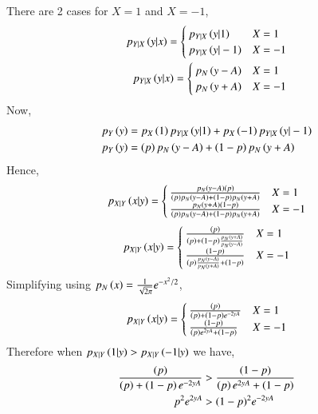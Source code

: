 \documentclass[journal,12pt,twocolumn]{IEEEtran}
\renewcommand\thesection{\arabic{section}}
\begin{document}
\begin{enumerate}[label=\thesection.\arabic*
,ref=\thesection.\theenumi]
There are 2 cases for $X= 1$ and $X = -1$,
\begin{align}
	 p_{Y|X}\left(y|x\right) = 
	 \begin{cases}
	 	p_{Y|X}\left(y|1\right) & X = 1 \\
	 	p_{Y|X}\left(y|-1\right) & X = -1 
	 \end{cases} \\
	 p_{Y|X}\left(y|x\right) = 
	 \begin{cases}
	 	p_N\left(y-A\right)   & X = 1 \\ 
	 	p_N\left(y+A\right)  & X = -1 
	 \end{cases} 
\end{align}
Now,
\begin{align}
p_Y\left(y\right) &= p_X\left(1\right) p_{Y|X}\left(y|1\right) +  p_X\left(-1\right) p_{Y|X}\left(y|-1\right) \\
p_Y\left(y\right) &= \left(p\right) p_N\left(y-A\right) + \left(1-p\right) p_N\left(y+A\right)
\end{align}
Hence,
\begin{align}
	 p_{X|Y}\left(x|y\right) = 
	 \begin{cases}
	 	\frac{p_N\left(y-A\right)(p)}{\left(p\right) p_N\left(y-A\right) + \left(1-p\right) p_N\left(y+A\right)} & X = 1 \\
	 	\frac{p_N\left(y+A\right)(1-p)}{\left(p\right) p_N\left(y-A\right) + \left(1-p\right) p_N\left(y+A\right)} & X = -1 
	 \end{cases}
\end{align}
\begin{align}
	 p_{X|Y}\left(x|y\right) = 
	 \begin{cases}
	 	\frac{(p)}{\left(p\right)  + \left(1-p\right) \frac{p_N\left(y+A\right)}{p_N\left(y-A\right)}}& X = 1 \\
	 	\frac{(1-p)}{\left(p\right) \frac{p_N\left(y-A\right)}{p_N\left(y+A\right)} + \left(1-p\right)} & X = -1 
	 \end{cases}
\end{align}
Simplifying using $p_N\left(x\right) = \frac{1}{\sqrt{2\pi}}e^{-x^2/2}$,
\begin{align}
	 p_{X|Y}\left(x|y\right) = 
	 \begin{cases}
	 	\frac{(p)}{\left(p\right)  + \left(1-p\right)e^{-2yA}}& X = 1 \\
	 	\frac{(1-p)}{\left(p\right)e^{2yA} + \left(1-p\right)} & X = -1 
	 \end{cases}
\end{align}
Therefore when $p_{X|Y}\left(1|y\right) > p_{X|Y}\left(-1|y\right)$ we have,
\begin{align}
    \frac{(p)}{\brak{p}  + \brak{1-p}e^{-2yA}} &> \frac{(1-p)}{\brak{p}e^{2yA} + \brak{1-p}} \\
    p^2e^{2yA} &> (1-p)^2e^{-2yA} \\

\end{align}
\end{enumerate}
\end{document}
